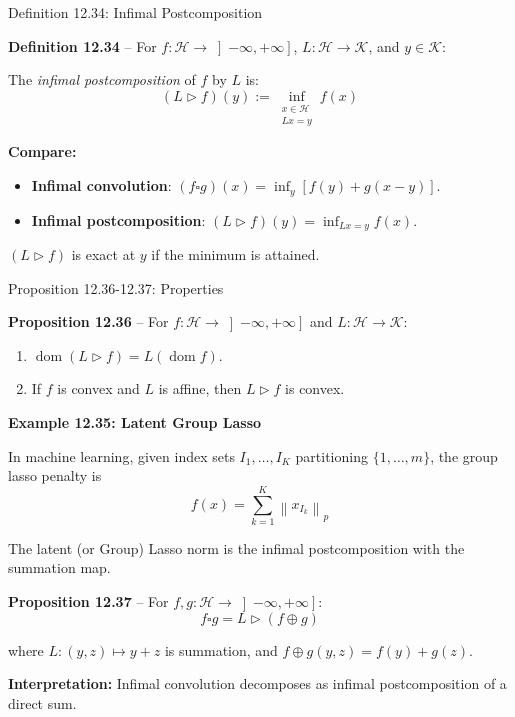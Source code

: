 \documentclass[aspectratio=169,10pt]{beamer}
\newcommand{\cH}{\mathcal{H}}
\newcommand{\cK}{\mathcal{K}}
\newcommand{\norm}[1]{\left\|#1\right\|}
\newcommand{\dom}{\operatorname{dom}}
\newcommand{\co}{\square}
\begin{document}
\begin{frame}{Definition 12.34: Infimal Postcomposition}

  \textbf{Definition 12.34} -- For $f: \cH \to \left]-\infty, +\infty\right]$,
  $L: \cH \to \cK$, and $y \in \cK$:

  The \textit{infimal postcomposition} of $f$ by $L$ is:
  \[
    (L \triangleright f)(y) := \inf_{\substack{x \in \cH \\ Lx = y}} f(x)
  \]

  \vspace{1cm}

  \textbf{Compare:}
  \begin{itemize}
    \item \textbf{Infimal convolution}: $(f \co g)(x) = \inf_y [f(y) + g(x-y)]$.
    \item \textbf{Infimal postcomposition}: $(L \triangleright f)(y) = \inf_{Lx=y} f(x)$.
  \end{itemize}

  \vspace{1cm}

  $(L \triangleright f)$ is exact at $y$ if the minimum is attained.

\end{frame}

\begin{frame}[allowframebreaks]{Proposition 12.36-12.37: Properties}

  \textbf{Proposition 12.36} -- For $f: \cH \to \left]-\infty, +\infty\right]$
  and $L: \cH \to \cK$:

  \begin{enumerate}
    \item[(i)] $\dom(L \triangleright f) = L(\dom f)$.
    \item[(ii)] If $f$ is convex and $L$ is affine, then $L \triangleright f$ is convex.
  \end{enumerate}

  \vspace{0.5cm}

  \textbf{Example 12.35: Latent Group Lasso}

  In machine learning, given index sets $I_1, \ldots, I_K$ partitioning
  $\{1, \ldots, m\}$, the group lasso penalty is
  \[
    f(x) = \sum_{k=1}^K \norm{x_{I_k}}_p
  \]

  The latent (or Group) Lasso norm is the infimal postcomposition
  with the summation map.

  \framebreak

  \textbf{Proposition 12.37} -- For $f, g: \cH \to \left]-\infty, +\infty\right]$:
  \[
    f \co g = L \triangleright (f \oplus g)
  \]

  where $L: (y, z) \mapsto y + z$ is summation, and $f \oplus g(y,z) = f(y) + g(z)$.

  \vspace{1cm}

  \textbf{Interpretation:} Infimal convolution decomposes as infimal
  postcomposition of a direct sum.

\end{frame}
\end{document}
